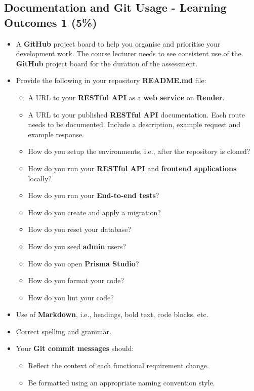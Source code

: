 \documentclass{article}
\begin{document}
\subsection*{Documentation and Git Usage - Learning Outcomes 1 (5\%)}
\begin{itemize}
	\item A \textbf{GitHub} project board to help you organise and prioritise your development work. The course lecturer needs to see consistent use of the \textbf{GitHub} project board for the duration of the assessment.
	\item Provide the following in your repository \textbf{README.md} file:
	\begin{itemize}
		\item A URL to your \textbf{RESTful API} as a \textbf{web service} on \textbf{Render}.
		\item A URL to your published \textbf{RESTful API} documentation. Each route needs to be documented. Include a description, example request and example response.
		\item How do you setup the environments, i.e., after the repository is cloned?
		\item How do you run your \textbf{RESTful API} and \textbf{frontend applications} locally?
		\item How do you run your \textbf{End-to-end tests}?
		\item How do you create and apply a migration?  
		\item How do you reset your database?
		\item How do you seed \textbf{admin} users?
		\item How do you open \textbf{Prisma Studio}?
		\item How do you format your code?
		\item How do you lint your code?		
	\end{itemize}
    \item Use of \textbf{Markdown}, i.e., headings, bold text, code blocks, etc.
    \item Correct spelling and grammar.
    \item Your \textbf{Git commit messages} should:
    \begin{itemize}
      \item Reflect the context of each functional requirement change.
      \item Be formatted using an appropriate naming convention style.
    \end{itemize}
\end{itemize}
\end{document}
